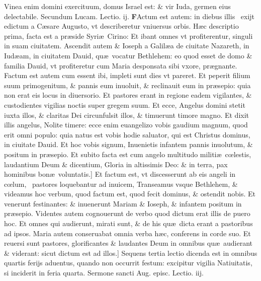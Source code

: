 \documentclass[a5paper,10pt]{book}
\def\rightmarginnote{%
	\lrmarginnote{\hskip\columnwidth \hskip -1em}}
\def\ae{æ}
\def\oe{œ}
\begin{document}
\begin{multicols*}{2}
Vinea enim domini exercituum, domus Israel est: \& vir Iuda, germen eius delectabile.
\newline \color{red} Secundum Lucam. \hfill Lectio. ij.\color{black}
\vspace{-.25em}
\lettrine[lines=2]{\bfseries \color{red} F}{}Actum\rightmarginnote{c.2.a} est autem: in diebus illis \textdagger \ exijt edictum a C\ae sare Augusto, vt describeretur vniuersus orbis.
H\ae c descriptio prima, facta est a pr\ae side Syri\ae \ Cirino: Et ibant omnes vt profiterentur, singuli in suam ciuitatem.
Ascendit autem \& Ioseph a Galil\ae a de ciuitate Nazareth, in Iud\ae am, in ciuitatem Dauid, qu\ae \ vocatur Bethlehem: eo quod esset de domo \& familia Dauid, vt profiteretur cum Maria desponsata sibi vxore, pr\ae gnante.
Factum est autem cum essent ibi, impleti sunt dies vt pareret.
Et peperit filium suum primogenitum, \& pannis eum inuoluit, \& reclinauit eum in pr\ae sepio: quia non erat eis locus in diuersorio. Et pastores erant in regione eadem vigilantes, \& custodientes vigilias noctis super gregem suum.
Et ecce, Angelus domini stetit iuxta illos, \& claritas Dei circunfulsit illos, \& timuerunt timore magno.
Et dixit illis angelus, Nolite timere: ecce enim euangelizo vobis gaudium magnum, quod erit omni populo: quia natus est vobis hodie saluator, qui est Christus dominus, in ciuitate Dauid.
Et hoc vobis signum, Inuenietis infantem pannis inuolutum, \& positum in pr\ae sepio.
Et subito facta est cum angelo multitudo militi\ae \ c\oe lestis, laudantium Deum \& dicentium, Gloria in altissimis Deo: \& in terra, pax hominibus bon\ae \ voluntatis.]
Et factum est, vt discesserunt ab eis angeli in c\oe lum, \textdagger \ pastores\rightmarginnote{B} loquebantur ad inuicem, Transeamus vsque Bethlehem, \& videamus hoc verbum, quod factum est, quod fecit dominus, \& ostendit nobis.
Et venerunt festinantes: \& inuenerunt Mariam \& Ioseph, \& infantem positum in pr\ae sepio.
Videntes autem cognouerunt de verbo quod dictum erat illis de puero hoc.
Et omnes qui audierunt, mirati sunt, \& de his qu\ae \ dicta erant a pastoribus ad ipsos.
Maria autem conseruabat omnia verba h\ae c, conferens in corde suo.
Et reuersi sunt pastores, glorificantes \& laudantes Deum in omnibus qu\ae \ audierant \& viderant: sicut dictum est ad illos.]
\newline {} \color{red} Sequens tertia lectio dicenda est in omnibus quartis ferijs aduentus, quando non occurrit festum: excipitur vigilia Natiuitatis, si inciderit in feria quarta. \color{black}
\newline \color{red} Sermone sancti Aug. episc. Lectio. iij. \color{black}

\end{multicols*}
\end{document}

